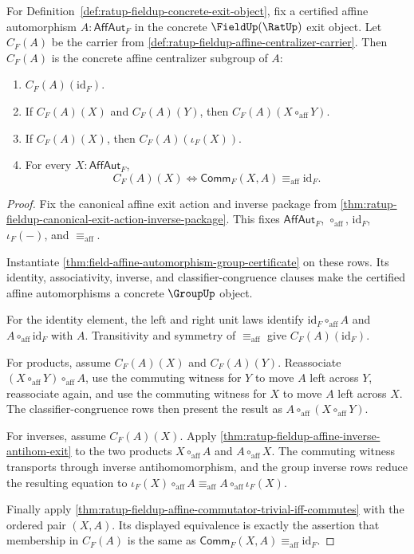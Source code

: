 \begin{theorem}
\label{thm:ratup-fieldup-affine-centralizer-subgroup}
For Definition~\ref{def:ratup-fieldup-concrete-exit-object}, fix a certified
affine automorphism $A:\mathsf{AffAut}_F$ in the concrete
$\FieldUp(\RatUp)$ exit object. Let $C_F(A)$ be the carrier from
\autoref{def:ratup-fieldup-affine-centralizer-carrier}. Then $C_F(A)$ is the
concrete affine centralizer subgroup of $A$:
\begin{enumerate}
\item $C_F(A)(\mathrm{id}_F)$.
\item If $C_F(A)(X)$ and $C_F(A)(Y)$, then
$C_F(A)(X\circ_{\mathrm{aff}}Y)$.
\item If $C_F(A)(X)$, then $C_F(A)(\iota_F(X))$.
\item For every $X:\mathsf{AffAut}_F$,
$$
C_F(A)(X)
\Longleftrightarrow
\mathsf{Comm}_F(X,A)\equiv_{\mathrm{aff}}\mathrm{id}_F.
$$
\end{enumerate}
\end{theorem}
\begin{proof}
Fix the canonical affine exit action and inverse package from
\autoref{thm:ratup-fieldup-canonical-exit-action-inverse-package}. This fixes
$\mathsf{AffAut}_F$, $\circ_{\mathrm{aff}}$, $\mathrm{id}_F$, $\iota_F(-)$,
and $\equiv_{\mathrm{aff}}$.

Instantiate \autoref{thm:field-affine-automorphism-group-certificate} on these
rows. Its identity, associativity, inverse, and classifier-congruence clauses
make the certified affine automorphisms a concrete $\GroupUp$ object.

For the identity element, the left and right unit laws identify
$\mathrm{id}_F\circ_{\mathrm{aff}}A$ and
$A\circ_{\mathrm{aff}}\mathrm{id}_F$ with $A$. Transitivity and symmetry of
$\equiv_{\mathrm{aff}}$ give $C_F(A)(\mathrm{id}_F)$.

For products, assume $C_F(A)(X)$ and $C_F(A)(Y)$. Reassociate
$(X\circ_{\mathrm{aff}}Y)\circ_{\mathrm{aff}}A$, use the commuting witness for
$Y$ to move $A$ left across $Y$, reassociate again, and use the commuting
witness for $X$ to move $A$ left across $X$. The classifier-congruence rows
then present the result as
$A\circ_{\mathrm{aff}}(X\circ_{\mathrm{aff}}Y)$.

For inverses, assume $C_F(A)(X)$. Apply
\autoref{thm:ratup-fieldup-affine-inverse-antihom-exit} to the two products
$X\circ_{\mathrm{aff}}A$ and $A\circ_{\mathrm{aff}}X$. The commuting witness
transports through inverse antihomomorphism, and the group inverse rows reduce
the resulting equation to
$\iota_F(X)\circ_{\mathrm{aff}}A\equiv_{\mathrm{aff}}
A\circ_{\mathrm{aff}}\iota_F(X)$.

Finally apply
\autoref{thm:ratup-fieldup-affine-commutator-trivial-iff-commutes} with the
ordered pair $(X,A)$. Its displayed equivalence is exactly the assertion that
membership in $C_F(A)$ is the same as
$\mathsf{Comm}_F(X,A)\equiv_{\mathrm{aff}}\mathrm{id}_F$.
\end{proof}

